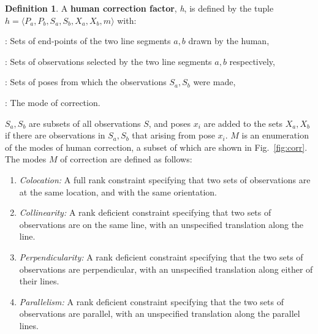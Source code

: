 \documentclass[letterpaper]{article} %
\newcommand{\figref}[1]{Fig.~\ref{fig:#1}}
\theoremstyle{definition}
\newtheorem{definition}{Definition}
\begin{document}
\begin{definition}
A {\bf human correction factor}, \emph{h}, is defined by the tuple $h=\langle
P_a, P_b, S_a, S_b, X_a, X_b, m \rangle$ with:

\enumerate

\item[$\bullet$ $P_a, P_b \subset \mathbb{R}^2$] : Sets of end-points of the
two line segments $a,b$ drawn by the human,

\item[$\bullet$ $S_a, S_b \subset S$] : Sets of observations selected by the
two line segments $a, b$ respectively,

\item[$\bullet$ $X_a, X_b \subset X_{1:t}$] : Sets of poses from which the
observations $S_a,S_b$ were made,

\item[$\bullet$ $m \in M$] : The mode of correction.

\end{definition}

$S_a, S_b$ are subsets of all observations $S$, and poses $x_i$ are added to
the sets $X_a, X_b$ if there are observations in $S_a, S_b$ that arising from
pose $x_i$. $M$ is an enumeration of the modes of human correction, a subset of which are shown in \figref{corr}. The modes $M$ of correction are defined as follows:

\begin{enumerate}
\item \emph{Colocation:} A full rank constraint specifying that two sets of
observations are at the same location, and with the same orientation.

\item \emph{Collinearity:} A rank deficient constraint specifying that two sets of
observations are on the same line, with an unspecified translation along the
line.

\item \emph{Perpendicularity:} A rank deficient constraint specifying that the
two sets of observations are perpendicular, with an unspecified translation
along either of their lines.

\item \emph{Parallelism:}  A rank deficient constraint specifying that the
two sets of observations are parallel, with an unspecified translation
along the parallel lines.

\end{enumerate}
\end{document}
